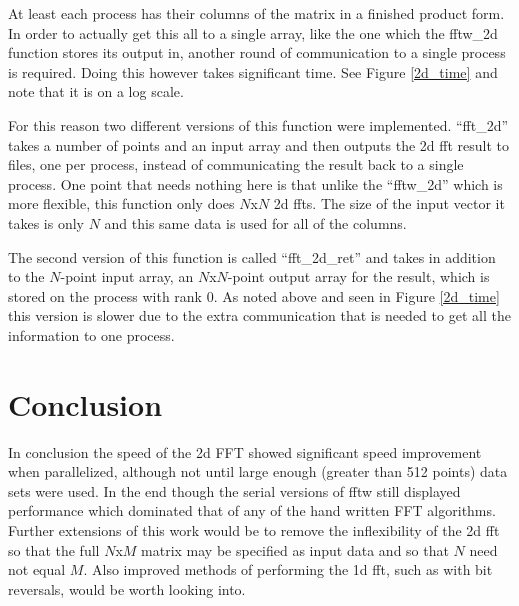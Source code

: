 \documentclass[12pt]{article}
\begin{document}
At least each process has their columns
of the matrix in a finished product form. In order to actually get this all
to a single array, like the one which the fftw\_2d function stores its
output in, another round of communication to a single process is required.
Doing this however takes significant time. See Figure \ref{2d_time} and note
that it is on a log scale. 

For this reason two different versions of this
function were implemented. ``fft\_2d'' takes a number of points and an input
array and then outputs the 2d fft result to files, one per process, instead
of communicating the result back to a single process. One point that needs
nothing here is that unlike the ``fftw\_2d'' which is more flexible, this
function only does $N$x$N$ 2d ffts. The size of the input vector it takes
is only $N$ and this same data is used for all of the columns.

The second version of this function is called ``fft\_2d\_ret'' and takes in
addition to the $N$-point input array, an $N$x$N$-point output array for 
the result, which is stored on the process with rank 0. As noted above and 
seen in Figure \ref{2d_time} this version
is slower due to the extra communication that is needed to get all the
information to one process.

\section{Conclusion}
In conclusion the speed of the 2d FFT showed significant speed improvement when parallelized, although not until large enough (greater than 512 points) data
sets were used. In the end though the serial versions of fftw still displayed performance which dominated that of any of the hand written FFT algorithms.
Further extensions of this work would be to remove the inflexibility of the
2d fft so that the full $N$x$M$ matrix may be specified as input data
and so that $N$ need not equal $M$. Also improved methods of performing
the 1d fft, such as with bit reversals, would be worth looking into.
\end{document}
